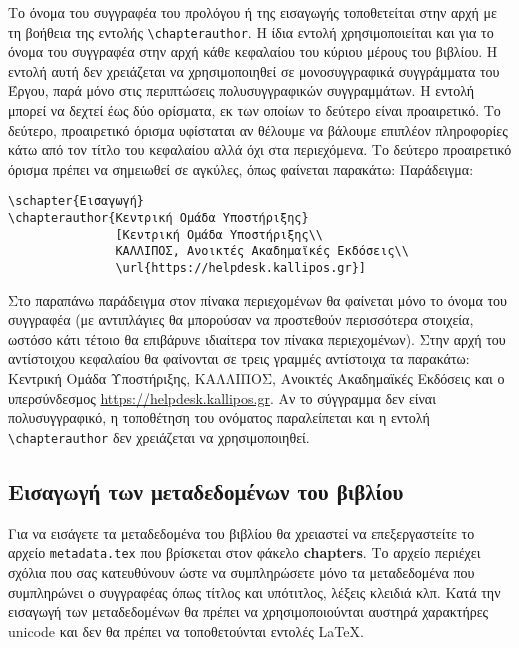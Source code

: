 \begin{refsection}
Το όνομα του συγγραφέα του προλόγου ή της εισαγωγής τοποθετείται στην αρχή με τη βοήθεια της
εντολής \verb|\chapterauthor|. Η ίδια εντολή χρησιμοποιείται και για το όνομα του συγγραφέα στην
αρχή κάθε κεφαλαίου του κύριου μέρους του βιβλίου. Η εντολή αυτή δεν χρειάζεται να χρησιμοποιηθεί
σε μονοσυγγραφικά συγγράμματα του Έργου, παρά μόνο στις περιπτώσεις πολυσυγγραφικών συγγραμμάτων.
Η εντολή μπορεί να δεχτεί έως δύο ορίσματα, εκ των οποίων το δεύτερο είναι προαιρετικό. Το δεύτερο,
προαιρετικό όρισμα υφίσταται αν θέλουμε να βάλουμε επιπλέον πληροφορίες κάτω από τον τίτλο του
κεφαλαίου αλλά όχι στα περιεχόμενα. Το δεύτερο προαιρετικό όρισμα πρέπει να σημειωθεί σε αγκύλες,
όπως φαίνεται παρακάτω:
Παράδειγμα:
\begin{verbatim}
\schapter{Εισαγωγή}
\chapterauthor{Κεντρική Ομάδα Υποστήριξης}
               [Κεντρική Ομάδα Υποστήριξης\\
               ΚΑΛΛΙΠΟΣ, Ανοικτές Ακαδημαϊκές Εκδόσεις\\
               \url{https://helpdesk.kallipos.gr}]
\end{verbatim}
Στο παραπάνω παράδειγμα στον πίνακα περιεχομένων θα φαίνεται μόνο το όνομα του συγγραφέα (με
αντιπλάγιες θα μπορούσαν να προστεθούν περισσότερα στοιχεία, ωστόσο κάτι τέτοιο θα επιβάρυνε
ιδιαίτερα τον πίνακα περιεχομένων). Στην αρχή του αντίστοιχου κεφαλαίου θα φαίνονται σε τρεις
γραμμές αντίστοιχα τα παρακάτω: Κεντρική Ομάδα Υποστήριξης, ΚΑΛΛΙΠΟΣ, Ανοικτές Ακαδημαϊκές Εκδόσεις και
ο υπερσύνδεσμος  \url{https://helpdesk.kallipos.gr}.
Αν το σύγγραμμα δεν είναι πολυσυγγραφικό, η τοποθέτηση του ονόματος παραλείπεται και η εντολή
\verb|\chapterauthor| δεν χρειάζεται να χρησιμοποιηθεί.

\subsection{Εισαγωγή των μεταδεδομένων του βιβλίου}

Για να εισάγετε τα μεταδεδομένα του βιβλίου θα χρειαστεί να επεξεργαστείτε το αρχείο \texttt{metadata.tex} 
που βρίσκεται στον φάκελο \textbf{chapters}. Το αρχείο περιέχει σχόλια που σας κατευθύνουν ώστε να
συμπληρώσετε μόνο τα μεταδεδομένα που συμπληρώνει ο συγγραφέας όπως τίτλος και υπότιτλος, λέξεις κλειδιά κλπ. Κατά την εισαγωγή των μεταδεδομένων θα πρέπει να χρησιμοποιούνται αυστηρά χαρακτήρες unicode και δεν θα πρέπει να τοποθετούνται εντολές \LaTeX.


\end{refsection}
